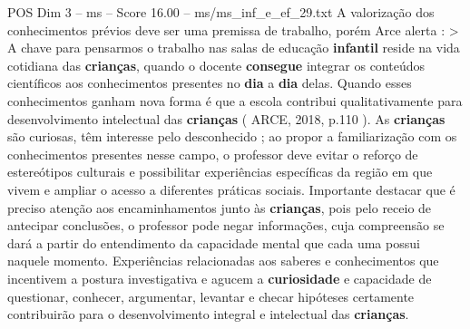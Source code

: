 \begin{textsample}{POS Dim 3 – ms – Score 16.00 – ms/ms\_inf\_e\_ef\_29.txt}
A valorização dos conhecimentos prévios deve ser uma premissa de trabalho, porém Arce alerta : > A chave para pensarmos o trabalho nas salas de educação \textbf{infantil} reside na vida cotidiana das \textbf{crianças}, quando o docente \textbf{consegue} integrar os conteúdos científicos aos conhecimentos presentes no \textbf{dia} a \textbf{dia} delas.
Quando esses conhecimentos ganham nova forma é que a escola contribui qualitativamente para desenvolvimento intelectual das \textbf{crianças} ( ARCE, 2018, p.110 ).
As \textbf{crianças} são curiosas, têm interesse pelo desconhecido ; ao propor a familiarização com os conhecimentos presentes nesse campo, o professor deve evitar o reforço de estereótipos culturais e possibilitar experiências específicas da região em que vivem e ampliar o acesso a diferentes práticas sociais.
Importante destacar que é preciso atenção aos encaminhamentos junto às \textbf{crianças}, pois pelo receio de antecipar conclusões, o professor pode negar informações, cuja compreensão se dará a partir do entendimento da capacidade mental que cada uma possui naquele momento.
Experiências relacionadas aos saberes e conhecimentos que incentivem a postura investigativa e agucem a \textbf{curiosidade} e capacidade de questionar, conhecer, argumentar, levantar e checar hipóteses certamente contribuirão para o desenvolvimento integral e intelectual das \textbf{crianças}.

\end{textsample}
